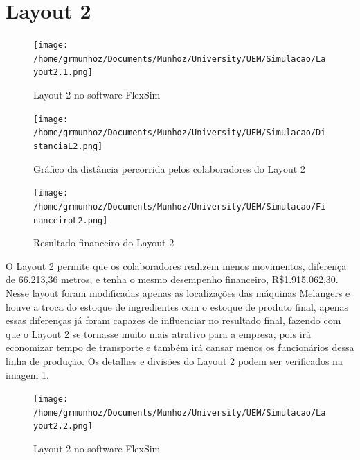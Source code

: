 \documentclass[
	12pt,				%
	openright,			%
	oneside,			%
	a4paper,			%
	english,			%
	french,				%
	spanish,			%
	brazil				%
	]{abntex2}
\begin{document}
\section*{Layout 2}

\begin{figure}[H]
\begin{center}
\caption{Layout 2 no software FlexSim}
\texttt{[image: /home/grmunhoz/Documents/Munhoz/University/UEM/Simulacao/Layout2.1.png]} 
\end{center}
\end{figure}

\begin{figure}[H]
\begin{center}
\caption{Gráfico da distância percorrida pelos colaboradores do Layout 2}
\texttt{[image: /home/grmunhoz/Documents/Munhoz/University/UEM/Simulacao/DistanciaL2.png]} 
\end{center}
\end{figure}

\begin{figure}[H]
\begin{center}
\caption{Resultado financeiro do Layout 2}
\texttt{[image: /home/grmunhoz/Documents/Munhoz/University/UEM/Simulacao/FinanceiroL2.png]} 
\end{center}
\end{figure}

O Layout 2 permite que os colaboradores realizem menos movimentos, diferença de 66.213,36 metros, e tenha o mesmo desempenho financeiro, R\$1.915.062,30. Nesse layout foram modificadas apenas as localizações das máquinas Melangers e houve a troca do estoque de ingredientes com o estoque de produto final, apenas essas diferenças já foram capazes de influenciar no resultado final, fazendo com que o Layout 2 se tornasse muito mais atrativo para a empresa, pois irá economizar tempo de transporte e também irá cansar menos os funcionários dessa linha de produção. Os detalhes e divisões do Layout 2 podem ser verificados na imagem \ref{detalhado}.

\begin{figure}[H]
\begin{center}
\caption{Layout 2 no software FlexSim}
\texttt{[image: /home/grmunhoz/Documents/Munhoz/University/UEM/Simulacao/Layout2.2.png]} 
\label{detalhado}
\end{center}
\end{figure}
\end{document}
